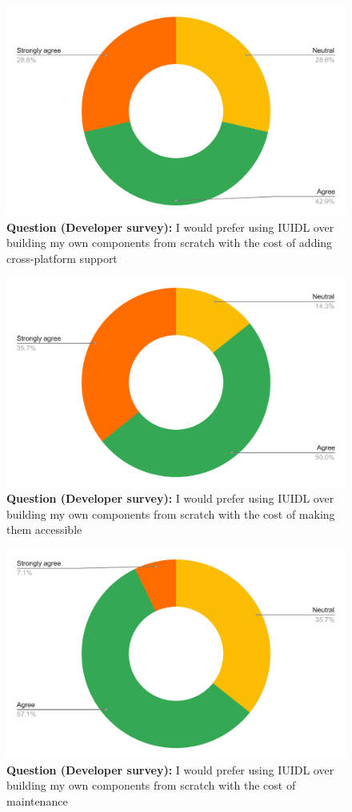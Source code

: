 \begin{figure}[H]
  \centering
  \includegraphics[width=13cm]{thesis/paper/images/p2d_q1.pdf}
  \textbf{Question (Developer survey):} I would prefer using IUIDL over building my own components from scratch with the cost of adding cross-platform support
\end{figure}

\begin{figure}[H]
  \centering
  \includegraphics[width=13cm]{thesis/paper/images/p2d_q2.pdf}
  \textbf{Question (Developer survey):} I would prefer using IUIDL over building my own components from scratch with the cost of making them accessible
\end{figure}

\begin{figure}[H]
  \centering
  \includegraphics[width=13cm]{thesis/paper/images/p2d_q3.pdf}
  \textbf{Question (Developer survey):} I would prefer using IUIDL over building my own components from scratch with the cost of maintenance
\end{figure}